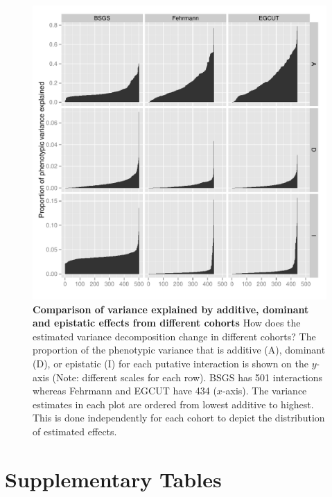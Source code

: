 \documentclass{article}
\begin{document}
\begin{figure}
	\centering
	\includegraphics[width=5in]{compare_vc2}
	\caption{\textbf{Comparison of variance explained by additive, dominant and epistatic effects from different cohorts} How does the estimated variance decomposition change in different cohorts? The proportion of the phenotypic variance that is additive (A), dominant (D), or epistatic (I) for each putative interaction is shown on the $y$-axis (Note: different scales for each row). BSGS has 501 interactions whereas Fehrmann and EGCUT have 434 ($x$-axis). The variance estimates in each plot are ordered from lowest additive to highest. This is done independently for each cohort to depict the distribution of estimated effects.}
	\label{fig:compare_vc}
\end{figure}





\clearpage
\section*{Supplementary Tables}
\setcounter{table}{0}
\makeatletter 
\renewcommand{\thetable}{S\@arabic\c@table} 
\makeatletter 
\end{document}
